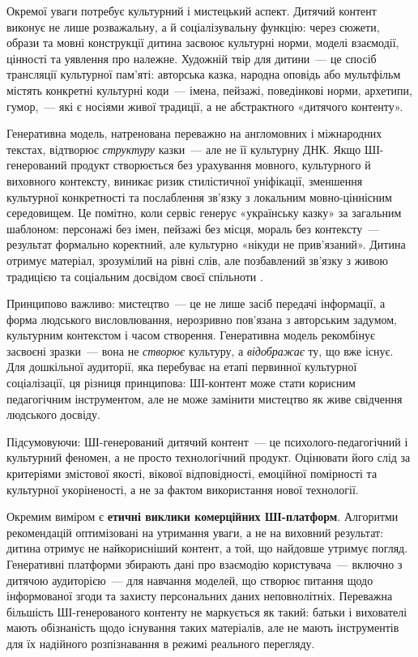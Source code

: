 \documentclass[14pt, a4paper]{extreport}
\begin{document}
Окремої уваги потребує культурний і мистецький аспект. Дитячий контент виконує не лише розважальну, а й соціалізувальну функцію: через сюжети, образи та мовні конструкції дитина засвоює культурні норми, моделі взаємодії, цінності та уявлення про належне. Художній твір для дитини~--- це спосіб трансляції культурної пам'яті: авторська казка, народна оповідь або мультфільм містять конкретні культурні коди~--- імена, пейзажі, поведінкові норми, архетипи, гумор,~--- які є носіями живої традиції, а не абстрактного «дитячого контенту».

Генеративна модель, натренована переважно на англомовних і міжнародних текстах, відтворює \textit{структуру} казки~--- але не її культурну ДНК. Якщо ШІ-генерований продукт створюється без урахування мовного, культурного й виховного контексту, виникає ризик стилістичної уніфікації, зменшення культурної конкретності та послаблення зв'язку з локальним мовно-ціннісним середовищем. Це помітно, коли сервіс генерує «українську казку» за загальним шаблоном: персонажі без імен, пейзажі без місця, мораль без контексту~--- результат формально коректний, але культурно «нікуди не прив'язаний». Дитина отримує матеріал, зрозумілий на рівні слів, але позбавлений зв'язку з живою традицією та соціальним досвідом своєї спільноти \cite{OECD2023,OECD2025,UNESCO2023}.

Принципово важливо: мистецтво~--- це не лише засіб передачі інформації, а форма людського висловлювання, нерозривно пов'язана з авторським задумом, культурним контекстом і часом створення. Генеративна модель рекомбінує засвоєні зразки~--- вона не \textit{створює} культуру, а \textit{відображає} ту, що вже існує. Для дошкільної аудиторії, яка перебуває на етапі первинної культурної соціалізації, ця різниця принципова: ШІ-контент може стати корисним педагогічним інструментом, але не може замінити мистецтво як живе свідчення людського досвіду.

Підсумовуючи: ШІ-генерований дитячий контент~--- це психолого-педагогічний і культурний феномен, а не просто технологічний продукт. Оцінювати його слід за критеріями змістової якості, вікової відповідності, емоційної помірності та культурної укоріненості, а не за фактом використання нової технології.

Окремим виміром є \textbf{етичні виклики комерційних ШІ-платформ}. Алгоритми рекомендацій оптимізовані на утримання уваги, а не на виховний результат: дитина отримує не найкорисніший контент, а той, що найдовше утримує погляд. Генеративні платформи збирають дані про взаємодію користувача~--- включно з дитячою аудиторією~--- для навчання моделей, що створює питання щодо інформованої згоди та захисту персональних даних неповнолітніх. Переважна більшість ШІ-генерованого контенту не маркується як такий: батьки і вихователі мають обізнаність щодо існування таких матеріалів, але не мають інструментів для їх надійного розпізнавання в режимі реального перегляду.
\end{document}
